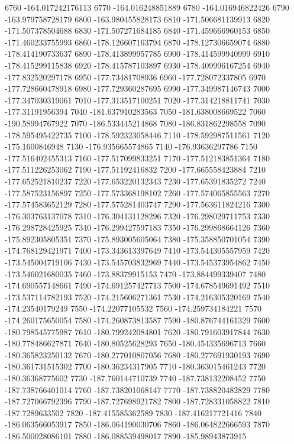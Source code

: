 {6760 -164.017242176113
6770 -164.016248851889
6780 -164.016946822426
6790 -163.979758728179
6800 -163.980455828173
6810 -171.506681139913
6820 -171.507378504688
6830 -171.507271684185
6840 -171.459666960153
6850 -171.460233755993
6860 -178.126607163794
6870 -178.127306659074
6880 -178.414190733637
6890 -178.413899957785
6900 -178.414599940999
6910 -178.415299115838
6920 -178.415787103897
6930 -178.409996167254
6940 -177.832520297178
6950 -177.73481708936
6960 -177.728072337805
6970 -177.728660478918
6980 -177.729360287695
6990 -177.349987146743
7000 -177.347030319061
7010 -177.313517100251
7020 -177.314218811741
7030 -177.31191956394
7040 -181.637910283563
7050 -181.638008669522
7060 -190.58994767922
7070 -186.533445214868
7080 -186.831862298558
7090 -178.595495422735
7100 -178.592323058446
7110 -178.592987511561
7120 -175.1600846948
7130 -176.935665574865
7140 -176.93636297786
7150 -177.516402455313
7160 -177.517099833251
7170 -177.512183851364
7180 -177.511226253062
7190 -177.51192416832
7200 -177.665558423884
7210 -177.652521810237
7220 -177.653220132343
7230 -177.65391835272
7240 -177.587523156897
7250 -177.573368198102
7260 -177.574065855563
7270 -177.574583652129
7280 -177.575281403747
7290 -177.563611824216
7300 -176.303763137078
7310 -176.304131128296
7320 -176.298029711753
7330 -176.298728425925
7340 -176.299427597183
7350 -176.299868664126
7360 -175.892305805351
7370 -175.893005605064
7380 -175.358850701054
7390 -174.768129421971
7400 -173.343613397649
7410 -173.544305557959
7420 -173.545004719106
7430 -173.545703832969
7440 -173.545373954862
7450 -173.546021680035
7460 -173.88379915153
7470 -173.884499339407
7480 -174.690557148661
7490 -174.691257427713
7500 -174.678549691492
7510 -173.537114782193
7520 -174.215606271361
7530 -174.216305320169
7540 -174.23540179249
7550 -174.22077105532
7560 -174.259734184221
7570 -174.260175650054
7580 -174.260873813587
7590 -180.876744161329
7600 -180.798545775987
7610 -180.799242084801
7620 -180.791603917844
7630 -180.778486627871
7640 -180.80525628293
7650 -180.454335696713
7660 -180.365823250132
7670 -180.277010807056
7680 -180.277691930193
7690 -180.361731515302
7700 -180.36234317905
7710 -180.363015461243
7720 -180.36368775602
7730 -187.760144710739
7740 -187.738132208452
7750 -187.738766401014
7760 -187.738201068147
7770 -187.738820482829
7780 -187.727066792396
7790 -187.727698921782
7800 -187.728331058822
7810 -187.7289633502
7820 -187.415585362589
7830 -187.416217721416
7840 -186.063566053917
7850 -186.064190030706
7860 -186.064822666593
7870 -186.500028086101
7880 -186.088539498017
7890 -185.98943873915
}
